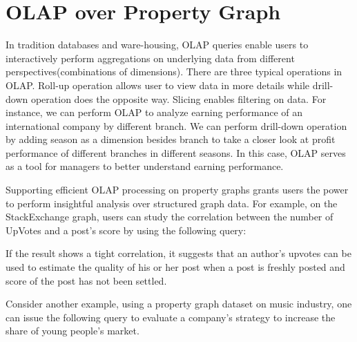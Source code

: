 \section{OLAP over Property Graph}

In tradition databases and ware-housing, OLAP queries enable users to interactively perform aggregations on underlying data from different perspectives(combinations  of dimensions). There are three typical operations in OLAP. Roll-up operation allows user to view data in more details while drill-down operation does the opposite way. Slicing enables filtering on data. For instance, we can perform OLAP to analyze earning performance of an international company by different branch. We can perform drill-down operation by adding season as a dimension besides branch to take a closer look at profit performance of different branches in different seasons. In this case, OLAP serves as a tool for managers to better understand earning performance.

Supporting efficient OLAP processing on property graphs grants users the power to perform insightful analysis over structured graph data. For example, on the StackExchange graph, users can study the correlation between the number of UpVotes and a post's score by using the following query:


 If the result shows a tight correlation, it suggests that an author’s upvotes can be used to estimate the quality of his or her post when a post is freshly posted and score of the post has not been settled.


Consider another example, using a property graph dataset on music industry,  one can issue the following query to evaluate a company's strategy to increase the share of young people's market.



